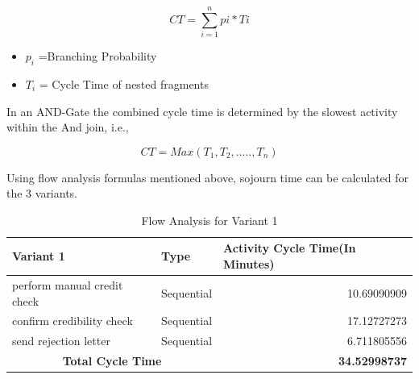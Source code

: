 \documentclass[a4paper]{article} %
\begin{document}
\begin{equation}
\label{CTX}
CT = \sum_{i=1}^{n} pi*Ti
\end{equation}
\begin{itemize}
\item$p_{i}$ =Branching Probability
\item$T_{i}$ = Cycle Time of nested fragments
 \end{itemize}
 
In an AND-Gate the combined cycle time is determined by the slowest activity within the And join, i.e.,

\begin{equation}
\label{CTP}
CT = Max(T_{1},T_{2},.....,T_{n})
\end{equation}

Using flow analysis formulas mentioned above, sojourn time can be calculated for the 3 variants.

\begin{table}[H]
  \centering
  
    \begin{tabular}{|c|c|r|}
    \hline
    \multicolumn{1}{|l|}{Variant 1} & \multicolumn{1}{l|}{Type} & \multicolumn{1}{l|}{Activity Cycle Time(In Minutes)} \bigstrut\\
    \hline
    \multicolumn{1}{|l|}{perform manual credit check} & \multicolumn{1}{l|}{Sequential} & 10.69090909 \bigstrut\\
    \hline
    \multicolumn{1}{|l|}{confirm credibility check} & \multicolumn{1}{l|}{Sequential} & 17.12727273 \bigstrut\\
    \hline
    \multicolumn{1}{|l|}{send rejection letter} & \multicolumn{1}{l|}{Sequential} & 6.711805556 \bigstrut\\
    \hline
    \multicolumn{2}{|c|}{\textbf{Total Cycle Time}} & \textbf{34.52998737} \bigstrut\\
    \hline
    \end{tabular}%
    \caption{Flow Analysis for Variant 1}
  \label{tab:sojtime}%
\end{table}%
\end{document}
